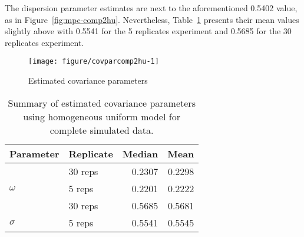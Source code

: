 The dispersion parameter estimates are next to the aforementioned 0.5402 value, as in Figure~\ref{fig:mpc-comp2hu}. Nevertheless, Table~\ref{tab:par-comp2hu} presents their mean values slightly above with 0.5541 for the 5 replicates experiment and 0.5685 for the 30 replicates experiment.


\begin{figure}[t]
  \centering
\begin{knitrout}
\color{fgcolor}
\texttt{[image: figure/covparcomp2hu-1]} 

\end{knitrout}
    \caption{Estimated covariance parameters} \label{fig:cpest-comp2hu}
  \label{fig:cp-comp2hu}
\end{figure}


\begin{table}[b]\centering
\caption{Summary of estimated covariance parameters using homogeneous uniform model for complete simulated data.}
\begin{knitrout}
\color{fgcolor}
\begin{tabular}{llrr}
\toprule
Parameter & Replicate & Median & Mean\\
\midrule
 & 30 reps & 0.2307 & 0.2298\\

\multirow{-2}{*}{\raggedright\arraybackslash $\omega$} & 5 reps & 0.2201 & 0.2222\\
\cmidrule{1-4}
 & 30 reps & 0.5685 & 0.5681\\

\multirow{-2}{*}{\raggedright\arraybackslash $\sigma$} & 5 reps & 0.5541 & 0.5545\\
\bottomrule
\end{tabular}


\end{knitrout}
\label{tab:par-comp2hu}
\end{table}


